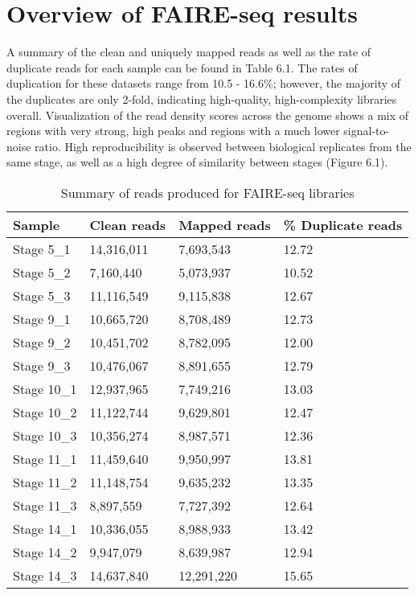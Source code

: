 \section{Overview of FAIRE-seq results}
A summary of the clean and uniquely mapped reads as well as the rate of duplicate reads for each sample can be found in Table 6.1. The rates of duplication for these datasets range from 10.5 - 16.6\%; however, the majority of the duplicates are only 2-fold, indicating high-quality, high-complexity libraries overall. Visualization of the read density scores across the genome shows a mix of regions with very strong, high peaks and regions with a much lower signal-to-noise ratio. High reproducibility is observed between biological replicates from the same stage, as well as a high degree of similarity between stages (Figure 6.1).\\

\begin{table}[h]
\centering
\begin{tabular}{|l|l|l|l|}
\hline
\textbf{Sample}      & \textbf{Clean reads} & \textbf{Mapped reads} & \textbf{\% Duplicate reads} \\ \hline
Stage 5\_1  & 14,316,011    & 7,693,543      & 12.72              \\ \hline
Stage 5\_2  & 7,160,440     & 5,073,937      & 10.52              \\ \hline
Stage 5\_3  & 11,116,549    & 9,115,838      & 12.67              \\ \hline
Stage 9\_1  & 10,665,720    & 8,708,489      & 12.73              \\ \hline
Stage 9\_2  & 10,451,702    & 8,782,095      & 12.00               \\ \hline
Stage 9\_3  & 10,476,067    & 8,891,655      & 12.79              \\ \hline
Stage 10\_1 & 12,937,965    & 7,749,216      & 13.03              \\ \hline
Stage 10\_2 & 11,122,744    & 9,629,801      & 12.47              \\ \hline
Stage 10\_3 & 10,356,274    & 8,987,571      & 12.36              \\ \hline
Stage 11\_1 & 11,459,640    & 9,950,997      & 13.81              \\ \hline
Stage 11\_2 & 11,148,754    & 9,635,232      & 13.35              \\ \hline
Stage 11\_3 & 8,897,559     & 7,727,392      & 12.64              \\ \hline
Stage 14\_1 & 10,336,055    & 8,988,933      & 13.42              \\ \hline
Stage 14\_2 & 9,947,079     & 8,639,987      & 12.94              \\ \hline
Stage 14\_3 & 14,637,840    & 12,291,220     & 15.65              \\  \hline
\end{tabular}
\caption{Summary of reads produced for FAIRE-seq libraries}
\label{Table 6.1}
\end{table}

